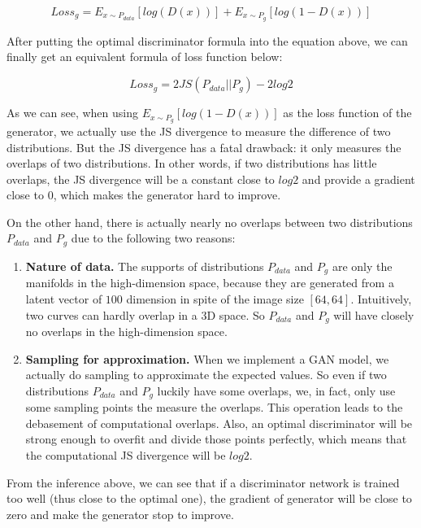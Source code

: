 \documentclass{article} %
\begin{document}
\begin{equation}
    Loss_g = E_{x \sim P_{data}}[log(D(x))]+E_{x \sim P_g}[log(1-D(x))]
\end{equation}

After putting the optimal discriminator formula into the equation above, we can finally get an equivalent formula of loss function below:

\begin{equation}
    Loss_g = 2JS(P_{data}||P_g) - 2log2
\end{equation}

As we can see, when using $E_{x \sim P_g}[log(1-D(x))]$ as the loss function of the generator, we actually use the JS divergence to measure the difference of two distributions. But the JS divergence has a fatal drawback: it only measures the overlaps of two distributions. In other words, if two distributions has little overlaps, the JS divergence will be a constant close to $log2$ and provide a gradient close to $0$, which makes the generator hard to improve.

On the other hand, there is actually nearly no overlaps between two distributions $P_{data}$ and $P_g$ due to the following two reasons:

\begin{enumerate}
    \item \textbf{Nature of data.} The supports of distributions $P_{data}$ and $P_g$ are only the manifolds in the high-dimension space, because they are generated from a latent vector of $100$ dimension in spite of the image size $[64, 64]$. Intuitively, two curves can hardly overlap in a 3D space. So $P_{data}$ and $P_g$ will have closely no overlaps in the high-dimension space.
    \item \textbf{Sampling for approximation.} When we implement a GAN model, we actually do sampling to approximate the expected values. So even if two distributions $P_{data}$ and $P_g$ luckily have some overlaps, we, in fact, only use some sampling points the measure the overlaps. This operation leads to the debasement of computational overlaps. Also, an optimal discriminator will be strong enough to overfit and divide those points perfectly, which means that the computational JS divergence will be $log2$.
\end{enumerate}

From the inference above, we can see that if a discriminator network is trained too well (thus close to the optimal one), the gradient of generator will be close to zero and make the generator stop to improve.
\end{document}
